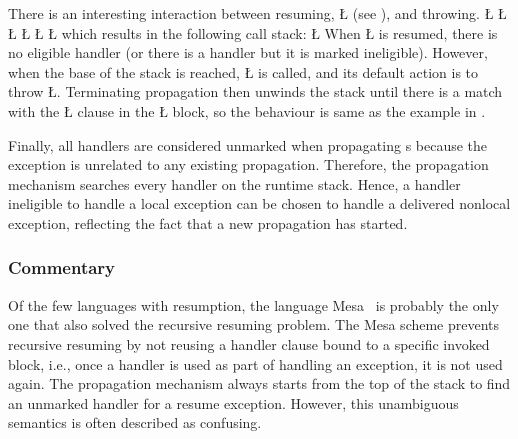\documentclass[openright,twoside]{report}
\begin{document}
There is an interesting interaction between resuming, \LGinlinetrue\LGbegin\lgrinde\L{}\endlgrinde\LGend{} (see ), and throwing.
\LGinlinefalse\LGbegin\lgrinde
\L{}
\L{}
\L{\LB{}}
\L{\LB{}}
\CE{}\L{\LB{}}
\CE{}\L{\LB{\}}}
\endlgrinde\LGend
which results in the following call stack:
\LGinlinefalse\LGbegin\lgrinde
\L{}
\endlgrinde\LGend
When \LGinlinetrue\LGbegin\lgrinde\L{}\endlgrinde\LGend{} is resumed, there is no eligible handler (or there is a handler but it is marked ineligible).
However, when the base of the stack is reached, \LGinlinetrue\LGbegin\lgrinde\L{}\endlgrinde\LGend{} is called, and its default action is to throw \LGinlinetrue\LGbegin\lgrinde\L{}\endlgrinde\LGend{}.
Terminating propagation then unwinds the stack until there is a match with the \LGinlinetrue\LGbegin\lgrinde\L{}\endlgrinde\LGend{} clause in the \LGinlinetrue\LGbegin\lgrinde\L{}\endlgrinde\LGend{} block, so the behaviour is same as the example in .

Finally, all handlers are considered unmarked when propagating s because the exception is unrelated to any existing propagation.
Therefore, the propagation mechanism searches every handler on the runtime stack.
Hence, a handler ineligible to handle a local exception can be chosen to handle a delivered nonlocal exception, reflecting the fact that a new propagation has started.


\subsubsection{Commentary}

Of the few languages with resumption, the language Mesa~\cite{Mesa} is probably the only one that also solved the recursive resuming problem.
The Mesa scheme prevents recursive resuming by not reusing a handler clause bound to a specific invoked block, i.e., once a handler is used as part of handling an exception, it is not used again.
The propagation mechanism always starts from the top of the stack to find an unmarked handler for a resume exception.
However, this unambiguous semantics is often described as confusing.
\end{document}
